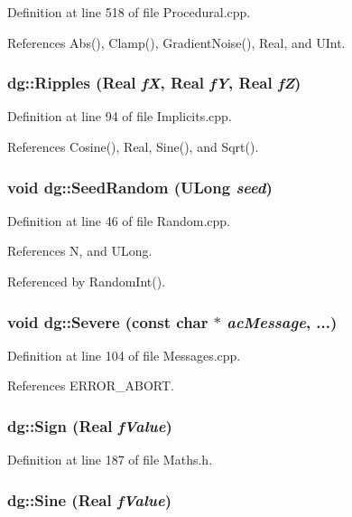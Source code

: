 Definition at line 518 of file Procedural.cpp.

References Abs(), Clamp(), Gradient\-Noise(), Real, and UInt.
\subsubsection{ dg::Ripples ({\bf Real} {\em f\-X}, {\bf Real} {\em f\-Y}, {\bf Real} {\em f\-Z})}\label{namespacedg_a78}




Definition at line 94 of file Implicits.cpp.

References Cosine(), Real, Sine(), and Sqrt().
\subsubsection{\setlength{\rightskip}{0pt plus 5cm}void dg::Seed\-Random ({\bf ULong} {\em seed})}\label{namespacedg_a166}




Definition at line 46 of file Random.cpp.

References N, and ULong.

Referenced by Random\-Int().
\subsubsection{\setlength{\rightskip}{0pt plus 5cm}void dg::Severe (const char $\ast$ {\em ac\-Message}, ...)\hspace{0.3cm}{\tt  [inline]}}\label{namespacedg_a125}




Definition at line 104 of file Messages.cpp.

References ERROR\_\-ABORT.
\subsubsection{ dg::Sign ({\bf Real} {\em f\-Value})\hspace{0.3cm}{\tt  [inline]}}\label{namespacedg_a102}




Definition at line 187 of file Maths.h.
\subsubsection{ dg::Sine ({\bf Real} {\em f\-Value})\hspace{0.3cm}{\tt  [inline]}}\label{namespacedg_a116}




